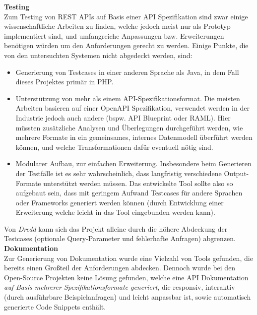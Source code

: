 \textbf{Testing}\\
Zum Testing von REST APIs auf Basis einer API Spezifikation sind zwar einige wissenschaftliche Arbeiten zu finden, welche jedoch meist nur als Prototyp implementiert sind, und umfangreiche Anpassungen bzw. Erweiterungen benötigen würden um den Anforderungen gerecht zu werden. Einige Punkte, die von den untersuchten Systemen nicht abgedeckt werden, sind:
\begin{itemize}
	\item Generierung von Testcases in einer anderen Sprache als Java, in dem Fall dieses Projektes primär in PHP.
	\item Unterstützung von mehr als einem API-Spezifikationsformat. Die meisten Arbeiten basieren auf einer OpenAPI Spezifikation, verwendet werden in der Industrie jedoch auch andere (bspw. API Blueprint oder RAML). Hier müssten zusätzliche Analysen und Überlegungen durchgeführt werden, wie mehrere Formate in ein gemeinsames, internes Datenmodell überführt werden können, und welche Transformationen dafür eventuell nötig sind.
	\item Modularer Aufbau, zur einfachen Erweiterung. Insbesondere beim Generieren der Testfälle ist es sehr wahrscheinlich, dass langfristig verschiedene Output-Formate unterstützt werden müssen. Das entwickelte Tool sollte also so aufgebaut sein, dass mit geringem Aufwand Testcases für andere Sprachen oder Frameworks generiert werden können (durch Entwicklung einer Erweiterung welche leicht in das Tool eingebunden werden kann).
\end{itemize}
Von \emph{Dredd} kann sich das Projekt alleine durch die höhere Abdeckung der Testcases (optionale Query-Parameter und fehlerhafte Anfragen) abgrenzen.\\

\textbf{Dokumentation}\\
Zur Generierung von Dokumentation wurde eine Vielzahl von Tools gefunden, die bereits einen Großteil der Anforderungen abdecken. Dennoch wurde bei den Open-Source Projekten keine Lösung gefunden, welche eine API Dokumentation \emph{auf Basis mehrerer Spezifikationsformate generiert}, die responsiv, interaktiv (durch ausführbare Beispielanfragen) und leicht anpassbar ist, sowie automatisch generierte Code Snippets enthält.
